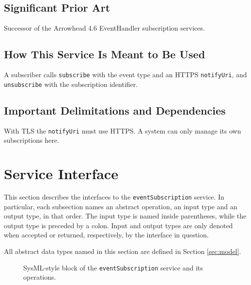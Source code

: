 \documentclass[a4paper]{arrowhead}
\begin{document}
\subsection{Significant Prior Art}

Successor of the Arrowhead 4.6 EventHandler subscription services.

\subsection{How This Service Is Meant to Be Used}

A subscriber calls \texttt{subscribe} with the event type and an HTTPS \texttt{notifyUri}, and \texttt{unsubscribe} with the subscription identifier.

\subsection{Important Delimitations and Dependencies}
\label{sec:delimitations}

With TLS the \texttt{notifyUri} must use HTTPS. A system can only manage its own subscriptions here.

\newpage

\section{Service Interface}
\label{sec:operations}

This section describes the interfaces to the \texttt{eventSubscription} service.
In particular, each subsection names an abstract operation, an input type and an output type, in that order.
The input type is named inside parentheses, while the output type is preceded by a colon.
Input and output types are only denoted when accepted or returned, respectively, by the interface in question.

All abstract data types named in this section are defined in Section \ref{sec:model}.

\begin{figure}[ht!]
  \centering
  \caption{SysML-style block of the \texttt{eventSubscription} service and its operations.}
  \label{fig:SD}
\end{figure}
\end{document}
